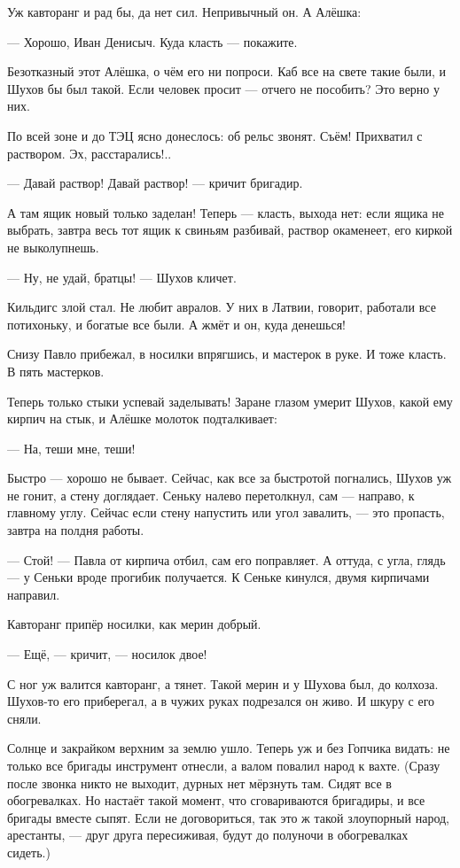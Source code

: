 Уж кавторанг и рад бы, да нет сил. Непривычный он. А Алёшка:

--- Хорошо, Иван Денисыч. Куда класть --- покажите.

Безотказный этот Алёшка, о чём его ни попроси. Каб все на свете такие были, и Шухов бы был
такой. Если человек просит --- отчего не пособить? Это верно у них.

По всей зоне и до ТЭЦ ясно донеслось: об рельс звонят. Съём! Прихватил с раствором. Эх,
расстарались!..

--- Давай раствор! Давай раствор! --- кричит бригадир.

А там ящик новый только заделан! Теперь --- класть, выхода нет: если ящика не выбрать, завтра
весь тот ящик к свиньям разбивай, раствор окаменеет, его киркой не выколупнешь.

--- Ну, не удай, братцы! --- Шухов кличет.

Кильдигс злой стал. Не любит авралов. У них в Латвии, говорит, работали все потихоньку, и
богатые все были. А жмёт и он, куда денешься!

Снизу Павло прибежал, в носилки впрягшись, и мастерок в руке. И тоже класть. В пять мастерков.

Теперь только стыки успевай заделывать! Заране глазом умерит Шухов, какой ему кирпич на
стык, и Алёшке молоток подталкивает:

--- На, теши мне, теши!

Быстро --- хорошо не бывает. Сейчас, как все за быстротой погнались, Шухов уж не гонит, а стену
доглядает. Сеньку налево перетолкнул, сам --- направо, к главному углу. Сейчас если стену
напустить или угол завалить, --- это пропасть, завтра на полдня работы.

--- Стой! --- Павла от кирпича отбил, сам его поправляет. А оттуда, с угла, глядь --- у Сеньки вроде
прогибик получается. К Сеньке кинулся, двумя кирпичами направил.

Кавторанг припёр носилки, как мерин добрый.

--- Ещё, --- кричит, --- носилок двое!

С ног уж валится кавторанг, а тянет. Такой мерин и у Шухова был, до колхоза. Шухов-то его
приберегал, а в чужих руках подрезался он живо. И шкуру с его сняли.

Солнце и закрайком верхним за землю ушло. Теперь уж и без Гопчика видать: не только все
бригады инструмент отнесли, а валом повалил народ к вахте. (Сразу после звонка никто не
выходит, дурных нет мёрзнуть там. Сидят все в обогревалках. Но настаёт такой момент, что
сговариваются бригадиры, и все бригады вместе сыпят. Если не договориться, так это ж такой
злоупорный народ, арестанты, --- друг друга пересиживая, будут до полуночи в обогревалках
сидеть.)


